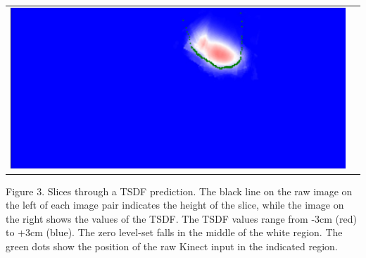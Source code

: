 \documentclass[10pt,onecolumn,letterpaper]{article}
\begin{document}
\begin{tabular}{cc}
\includegraphics[height=\imheight]{real/head/slice_00170.jpg} 
\end{tabular}
\vspace{10pt}

{\centering \small Figure 3. Slices through a TSDF prediction. The black line on the raw image on the left of each image pair indicates the height of the slice, while the image on the right shows the values of the TSDF.
The TSDF values range from -3cm (red) to +3cm (blue).
The zero level-set falls in the middle of the white region.
The green dots show the position of the raw Kinect input in the indicated region.
}
\vspace{10pt}
\end{document}

